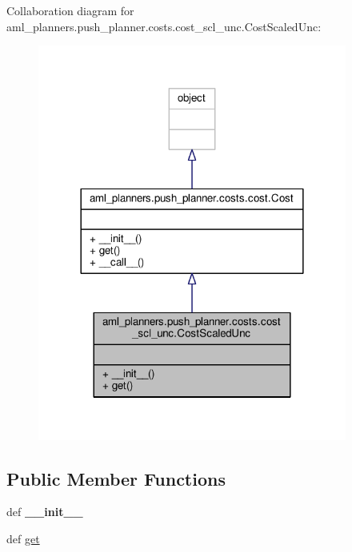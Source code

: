 Collaboration diagram for aml\-\_\-planners.\-push\-\_\-planner.\-costs.\-cost\-\_\-scl\-\_\-unc.\-Cost\-Scaled\-Unc\-:\nopagebreak
\begin{figure}[H]
\begin{center}
\leavevmode
\includegraphics[width=288pt]{classaml__planners_1_1push__planner_1_1costs_1_1cost__scl__unc_1_1_cost_scaled_unc__coll__graph}
\end{center}
\end{figure}
\subsection*{Public Member Functions}
\begin{DoxyCompactItemize}
\item 
\hypertarget{classaml__planners_1_1push__planner_1_1costs_1_1cost__scl__unc_1_1_cost_scaled_unc_a9b35214f01d0f425c1db9e33b511e332}{def {\bfseries \-\_\-\-\_\-init\-\_\-\-\_\-}}\label{classaml__planners_1_1push__planner_1_1costs_1_1cost__scl__unc_1_1_cost_scaled_unc_a9b35214f01d0f425c1db9e33b511e332}

\item 
def \hyperlink{classaml__planners_1_1push__planner_1_1costs_1_1cost__scl__unc_1_1_cost_scaled_unc_a9a3a6dae7257fa41eb19ed1f4787c7c6}{get}
\end{DoxyCompactItemize}


